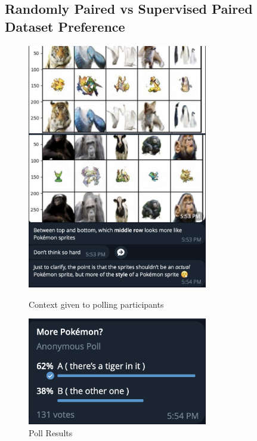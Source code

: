 \documentclass[twoside,english,notitlepage]{report}
\begin{document}
\subsection{Randomly Paired vs Supervised Paired Dataset Preference}

\begin{figure}[h]
    \centering
    \includegraphics[width=0.7\textwidth]{task2/subjectivePolling.png}
    \vspace{-10pt}
    \caption{Context given to polling participants}
    \vspace{12pt}
    \includegraphics[width=0.7\textwidth]{task2/surveyResults.png}
    \vspace{-10pt}
    \caption{Poll Results}
    \vspace{12pt}
    \label{fig:survey}
\end{figure}
\end{document}
